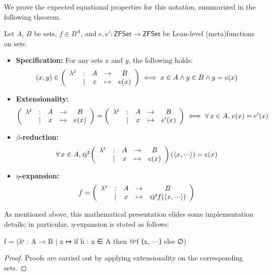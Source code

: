 We prove the expected equational properties for this notation, summarized in the following theorem.

\begin{theorem}
  \label{thm:lambda}
  Let $A$, $B$ be sets, $f \in B^A$, and $e,e' \colon \mathsf{ZFSet} \to \mathsf{ZFSet}$ be Lean-level (meta)functions on sets.
  \begin{itemize}
    \item \textbf{Specification:} For any sets $x$ and $y$, the following holds:
          \begin{equation*}
            (x, y) \in \left( \begin{array}{ccccc} \lambda^{\scriptscriptstyle{\mathsf{Z}}} & : & A & \to & B \\ & \mid & x & \mapsto & e(x) \end{array} \right) \iff x \in A \land y \in B \land y = e(x)
          \end{equation*}
    \item \textbf{Extensionality:}
          \begin{equation*}
            \left( \begin{array}{ccccc} \lambda^{\scriptscriptstyle{\mathsf{Z}}} & : & A & \to & B \\ & \mid & x & \mapsto & e(x) \end{array} \right) = \left( \begin{array}{ccccc} \lambda^{\scriptscriptstyle{\mathsf{Z}}} & : & A & \to & B \\ & \mid & x & \mapsto & e'(x) \end{array} \right) \iff \forall\, x \in A,\, e(x) = e'(x)
          \end{equation*}
    \item \textbf{$\beta$-reduction:}
          \begin{equation*}
            \forall\, x \in A, \fapply{\left(\zlambda{A}{B}{x}{e(x)}\right)}{\langle x, \irrelprf \rangle} = e(x)
          \end{equation*}
    \item \textbf{$\eta$-expansion:}
          \begin{equation*}
            f = \left(\zlambda{A}{B}{x}{\fapply{f}{\langle x, \irrelprf \rangle}}\right)
          \end{equation*}
  \end{itemize}

  As mentioned above, this mathematical presentation elides some implementation details;
  in particular, \(\eta\)-expansion is stated as follows:
  \begin{leanlisting}
f = (λᶻ : A → B
        | x ↦ if h : x ∈ A then @ᶻf ⟨x, $\irrelprf$⟩ else ∅)
  \end{leanlisting}
\end{theorem}
\begin{proof}
  Proofs are carried out by applying extensionality on the corresponding sets.
\end{proof}

